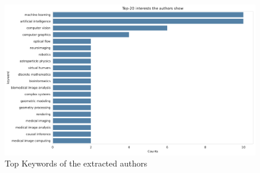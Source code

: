 \begin{figure}
    \centering
    \includegraphics[width=0.8\linewidth]{figures/top-keywords.pdf}
    \caption{Top Keywords of the extracted authors}
    \label{fig:top-keywords}
\end{figure}
